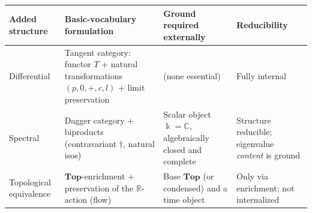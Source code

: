 \documentclass[a4paper,11pt]{article}
\begin{document}
\begin{longtable}[]{@{}llll@{}}
\toprule
\begin{minipage}[b]{0.22\columnwidth}\raggedright
Added structure\strut
\end{minipage} & \begin{minipage}[b]{0.22\columnwidth}\raggedright
Basic-vocabulary formulation\strut
\end{minipage} & \begin{minipage}[b]{0.22\columnwidth}\raggedright
Ground required externally\strut
\end{minipage} & \begin{minipage}[b]{0.22\columnwidth}\raggedright
Reducibility\strut
\end{minipage}\tabularnewline
\midrule
\endhead
\begin{minipage}[t]{0.22\columnwidth}\raggedright
Differential\strut
\end{minipage} & \begin{minipage}[t]{0.22\columnwidth}\raggedright
Tangent category: functor \(T\) + natural transformations
\((p,0,+,c,l)\) + limit preservation\strut
\end{minipage} & \begin{minipage}[t]{0.22\columnwidth}\raggedright
(none essential)\strut
\end{minipage} & \begin{minipage}[t]{0.22\columnwidth}\raggedright
Fully internal\strut
\end{minipage}\tabularnewline
\begin{minipage}[t]{0.22\columnwidth}\raggedright
Spectral\strut
\end{minipage} & \begin{minipage}[t]{0.22\columnwidth}\raggedright
Dagger category + biproducts (contravariant \(\dagger\), natural
isos)\strut
\end{minipage} & \begin{minipage}[t]{0.22\columnwidth}\raggedright
Scalar object \(\Bbbk=\mathbb{C}\), algebraically closed and
complete\strut
\end{minipage} & \begin{minipage}[t]{0.22\columnwidth}\raggedright
Structure reducible; eigenvalue \emph{content} is ground\strut
\end{minipage}\tabularnewline
\begin{minipage}[t]{0.22\columnwidth}\raggedright
Topological equivalence\strut
\end{minipage} & \begin{minipage}[t]{0.22\columnwidth}\raggedright
\(\mathbf{Top}\)-enrichment + preservation of the \(\mathbb{R}\)-action
(flow)\strut
\end{minipage} & \begin{minipage}[t]{0.22\columnwidth}\raggedright
Base \(\mathbf{Top}\) (or condensed) and a time object\strut
\end{minipage} & \begin{minipage}[t]{0.22\columnwidth}\raggedright
Only via enrichment; not internalized\strut
\end{minipage}\tabularnewline
\bottomrule
\end{longtable}
\end{document}
